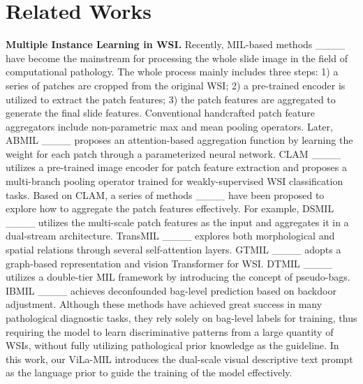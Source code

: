 \section{Related Works}
\noindent\textbf{Multiple Instance Learning in WSI.}
Recently, MIL-based methods ____ have become the mainstream for processing the whole slide image in the field of computational pathology. The whole process mainly includes three steps: 1) a series of patches are cropped from the original WSI; 2) a pre-trained encoder is utilized to extract the patch features; 3) the patch features are aggregated to generate the final slide features. Conventional handcrafted patch feature aggregators include non-parametric max and mean pooling operators. Later, ABMIL ____ proposes an attention-based aggregation function by learning the weight for each patch through a parameterized neural network. CLAM ____ utilizes a pre-trained image encoder for patch feature extraction and proposes a multi-branch pooling operator trained for weakly-supervised WSI classification tasks. 
Based on CLAM, a series of methods ____ have been proposed to explore how to aggregate the patch features effectively. 
For example, DSMIL ____ utilizes the multi-scale patch features as the input and aggregates it in a dual-stream architecture. 
TransMIL ____ explores both morphological and spatial relations through several self-attention layers. 
GTMIL ____ adopts a graph-based representation and vision Transformer for WSI. 
DTMIL ____ utilizes a double-tier MIL framework by introducing the concept of pseudo-bags.
IBMIL ____ achieves deconfounded bag-level prediction based on backdoor adjustment.
Although these methods have achieved great success in many pathological diagnostic tasks, they rely solely on bag-level labels for training, thus requiring the model to learn discriminative patterns from a large quantity of WSIs, without fully utilizing pathological prior knowledge as the guideline. 
In this work, our ViLa-MIL introduces the dual-scale visual descriptive text prompt as the language prior to guide the training of the model effectively. 

